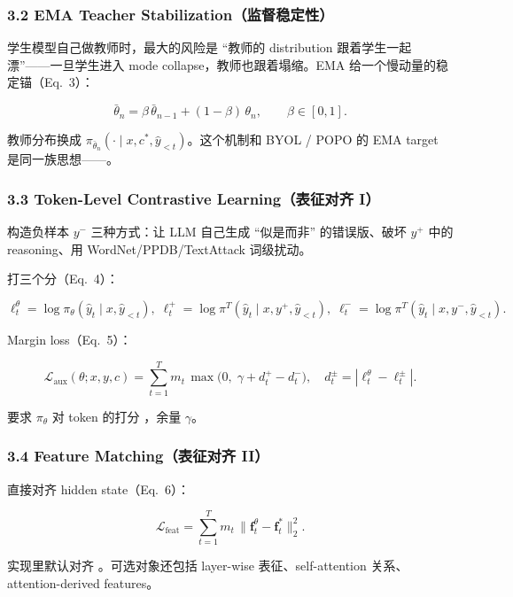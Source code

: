 \subsubsection{3.2 EMA Teacher Stabilization（监督稳定性）}

学生模型自己做教师时，最大的风险是 ``教师的 distribution 跟着学生一起漂''——一旦学生进入 mode collapse，教师也跟着塌缩。EMA 给一个慢动量的稳定锚（Eq.~3）：

\[
\bar\theta_n = \beta\,\bar\theta_{n-1} + (1-\beta)\,\theta_n,\qquad \beta\in[0,1].
\]

教师分布换成 $\pi_{\bar\theta_n}(\cdot\mid x,c^*,\hat y_{<t})$。这个机制和 BYOL / POPO 的 EMA target 是同一族思想——。

\subsubsection{3.3 Token-Level Contrastive Learning（表征对齐 I）}

构造负样本 $y^-$ 三种方式：让 LLM 自己生成 ``似是而非'' 的错误版、破坏 $y^+$ 中的 reasoning、用 WordNet/PPDB/TextAttack 词级扰动。

打三个分（Eq.~4）：

\[
\ell_t^\theta = \log\pi_\theta(\hat y_t\mid x,\hat y_{<t}),\;
\ell_t^{+}=\log\pi^{T}(\hat y_t\mid x,y^{+},\hat y_{<t}),\;
\ell_t^{-}=\log\pi^{T}(\hat y_t\mid x,y^{-},\hat y_{<t}).
\]

Margin loss（Eq.~5）：

\[
\mathcal{L}_{\text{aux}}(\theta;x,y,c) =
\sum_{t=1}^{T}m_t\,\max\!\bigl(0,\;\gamma + d_t^{+} - d_t^{-}\bigr),
\quad d_t^{\pm}=|\ell_t^\theta-\ell_t^{\pm}|.
\]

要求 $\pi_\theta$ 对 token 的打分 ，余量 $\gamma$。

\subsubsection{3.4 Feature Matching（表征对齐 II）}

直接对齐 hidden state（Eq.~6）：

\[
\mathcal{L}_{\text{feat}}
= \sum_{t=1}^{T}m_t \,\|\mathbf{f}_t^\theta - \mathbf{f}_t^{*}\|_2^{2}.
\]

实现里默认对齐 。可选对象还包括 layer-wise 表征、self-attention 关系、attention-derived features。

